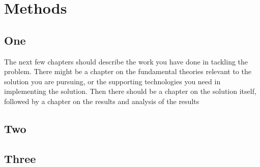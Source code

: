 
\chapter{Methods}
\begin{spacing}{1.5}
\setlength{\parskip}{0.3in}


\section{One}

The next few chapters should describe the work you have done in tackling the problem. There might be a chapter on the fundamental theories relevant to the solution you are pursuing, or the supporting technologies you need in implementing the solution. Then there should be a chapter on the solution itself, followed by a chapter on the results and analysis of the results

\section{Two}


\section{Three}


\end{spacing}
\newpage
